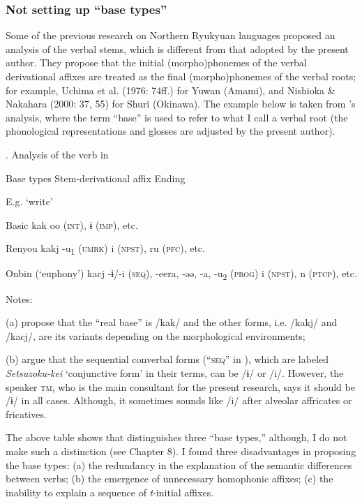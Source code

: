 \subsubsection{Not setting up “base types”}

Some of the previous research on Northern Ryukyuan languages proposed an analysis of the verbal stems, which is different from that adopted by the present author. They propose that the initial (morpho)phonemes of the verbal derivational affixes are treated as the final (morpho)phonemes of the verbal roots; for example, Uchima et al. (1976: 74ff.) for Yuwan (Amami), and Nishioka \& Nakahara (2000: 37, 55) for Shuri (Okinawa). The example below is taken from \citet{UchimaEtAl1976}’s analysis, where the term “base” is used to refer to what I call a verbal root (the phonological representations and glosses are adjusted by the present author).

\begin{styleBeschriftung}
\textmd{}\textmd{. Analysis of the verb in \citet{UchimaEtAl1976}}
\end{styleBeschriftung}

Base types    Stem-derivational affix  Ending

  E.g. ‘write’    

Basic  kak    oo (\textsc{int}), ɨ (\textsc{imp}), etc.

Renyou  kakj  {}-u\textsubscript{1} (\textsc{umrk})  i (\textsc{npst}), ru (\textsc{pfc}), etc.

Onbin (‘euphony’)  kacj  {}-ɨ/-i (\textsc{seq}), -eera, -əə, -a, -u\textsubscript{2} (\textsc{prog})  i (\textsc{npst}), n (\textsc{ptcp}), etc.

Notes:

(a) \citet[78]{UchimaEtAl1976} propose that the “real base” is /kak/ and the other forms, i.e. /kakj/ and /kacj/, are its variants depending on the morphological environments;

(b) \citet[91-92]{UchimaEtAl1976} argue that the sequential converbal forms (“\textsc{seq}” in ), which are labeled \textit{Setsuzoku-kei} ‘conjunctive form’ in their terms, can be /ɨ/ or /i/. However, the speaker \textsc{tm}, who is the main consultant for the present research, says it should be /ɨ/ in all cases. Although, it sometimes sounds like /i/ after alveolar affricates or fricatives.

The above table shows that \citet{UchimaEtAl1976} distinguishes three “base types,” although, I do not make such a distinction (see Chapter 8). I found three disadvantages in proposing the base types: (a) the redundancy in the explanation of the semantic differences between verbs; (b) the emergence of unnecessary homophonic affixes; (c) the inability to explain a sequence of \textit{t}{}-initial affixes.


